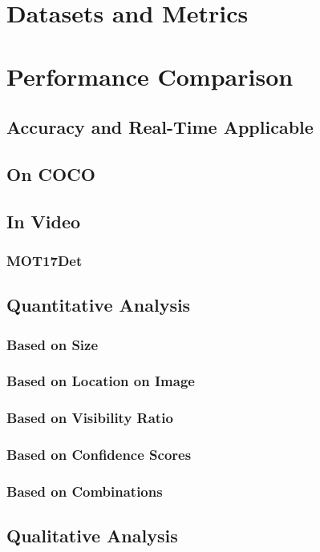 \documentclass{article}
\begin{document}
\section{Datasets and Metrics}
\section{Performance Comparison}
\subsection{Accuracy and Real-Time Applicable}
\subsection{On COCO}

\subsection{In Video}
\subsubsection{MOT17Det}

\subsection{Quantitative Analysis}
\subsubsection{Based on Size}
\subsubsection{Based on Location on Image}
\subsubsection{Based on Visibility Ratio}
\subsubsection{Based on Confidence Scores}
\subsubsection{Based on Combinations}

\subsection{Qualitative Analysis}
\end{document}
